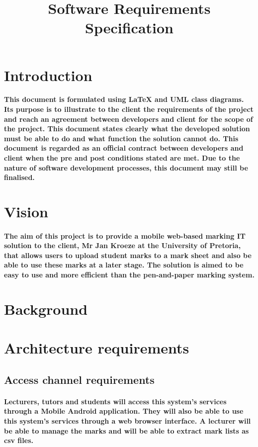 \documentclass[12pt]{article}
\title{Software Requirements Specification}
\date{}
\begin{document}
  \maketitle  
  \tableofcontents
  \section{Introduction}
  \paragraph*{This document is formulated using LaTeX and UML class diagrams. Its purpose is to illustrate to the client the requirements of the project and reach an agreement between developers and client for the scope of the project. This document states clearly what the developed solution must be able to do and what function the solution cannot do. This document is regarded as an official contract between developers and client when the pre and post conditions stated are met. Due to the nature of software development processes, this document may still be finalised.}
  \section{Vision}
  \paragraph*{The aim of this project is to provide a mobile web-based marking IT solution to the client, Mr Jan Kroeze at the University of Pretoria, that allows users to upload student marks to a mark sheet and also be able to use these marks at a later stage. The solution is aimed to be easy to use and more efficient than the pen-and-paper marking system.}
  \section{Background}
  \section{Architecture requirements}
  \subsection{Access channel requirements}
  \paragraph*{Lecturers, tutors and students will access this system's services through a Mobile Android application. They will also be able to use this system's services through a web browser interface. A lecturer will be able to manage the marks and will be able to extract mark lists as csv files.}
\end{document}
